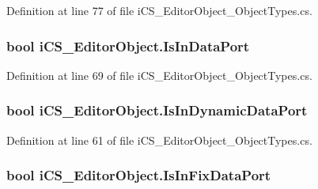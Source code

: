 Definition at line 77 of file i\+C\+S\+\_\+\+Editor\+Object\+\_\+\+Object\+Types.\+cs.

\hypertarget{classi_c_s___editor_object_a449ba0e08ecd400874af5e38237f3940}{
\subsubsection[{Is\+In\+Data\+Port}]{\setlength{\rightskip}{0pt plus 5cm}bool i\+C\+S\+\_\+\+Editor\+Object.\+Is\+In\+Data\+Port\hspace{0.3cm}{\ttfamily [get]}}}\label{classi_c_s___editor_object_a449ba0e08ecd400874af5e38237f3940}


Definition at line 69 of file i\+C\+S\+\_\+\+Editor\+Object\+\_\+\+Object\+Types.\+cs.

\hypertarget{classi_c_s___editor_object_a274eabe9985e53f9b8baaa0ddfe3132d}{
\subsubsection[{Is\+In\+Dynamic\+Data\+Port}]{\setlength{\rightskip}{0pt plus 5cm}bool i\+C\+S\+\_\+\+Editor\+Object.\+Is\+In\+Dynamic\+Data\+Port\hspace{0.3cm}{\ttfamily [get]}}}\label{classi_c_s___editor_object_a274eabe9985e53f9b8baaa0ddfe3132d}


Definition at line 61 of file i\+C\+S\+\_\+\+Editor\+Object\+\_\+\+Object\+Types.\+cs.

\hypertarget{classi_c_s___editor_object_a850200df184c1fb6cd82fc8386da5d15}{
\subsubsection[{Is\+In\+Fix\+Data\+Port}]{\setlength{\rightskip}{0pt plus 5cm}bool i\+C\+S\+\_\+\+Editor\+Object.\+Is\+In\+Fix\+Data\+Port\hspace{0.3cm}{\ttfamily [get]}}}\label{classi_c_s___editor_object_a850200df184c1fb6cd82fc8386da5d15}


